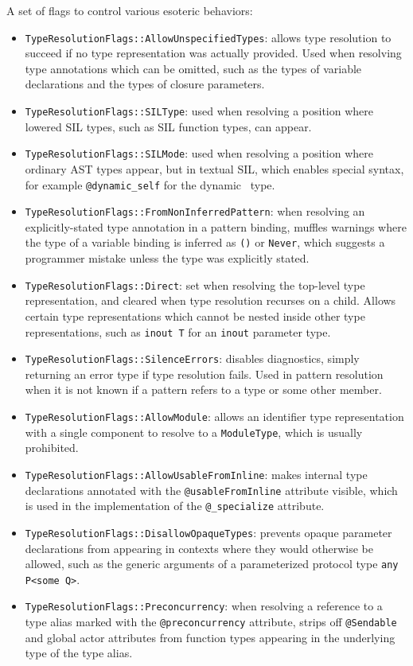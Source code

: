 \documentclass[../generics]{subfiles}
\begin{document}
A set of flags to control various esoteric behaviors:
\begin{itemize}
\item \texttt{TypeResolutionFlags::AllowUnspecifiedTypes}: allows type resolution to succeed if no type representation was actually provided. Used when resolving type annotations which can be omitted, such as the types of variable declarations and the types of closure parameters.
\item \texttt{TypeResolutionFlags::SILType}: used when resolving a position where lowered SIL types, such as SIL function types, can appear.
\item \texttt{TypeResolutionFlags::SILMode}: used when resolving a position where ordinary AST types appear, but in textual SIL, which enables special syntax, for example \verb|@dynamic_self| for the dynamic \tSelf\ type.
\item \texttt{TypeResolutionFlags::FromNonInferredPattern}: when resolving an explicitly-stated type annotation in a pattern binding, muffles warnings where the type of a variable binding is inferred as \texttt{()} or \texttt{Never}, which suggests a programmer mistake unless the type was explicitly stated.
\item \texttt{TypeResolutionFlags::Direct}: set when resolving the top-level type representation, and cleared when type resolution recurses on a child. Allows certain type representations which cannot be nested inside other type representations, such as \texttt{inout T} for an \texttt{inout} parameter type.
\item \texttt{TypeResolutionFlags::SilenceErrors}: disables diagnostics, simply returning an error type if type resolution fails. Used in pattern resolution when it is not known if a pattern refers to a type or some other member.
\item \texttt{TypeResolutionFlags::AllowModule}: allows an identifier type representation with a single component to resolve to a \texttt{ModuleType}, which is usually prohibited.
\item \texttt{TypeResolutionFlags::AllowUsableFromInline}: makes internal type declarations annotated with the \texttt{@usableFromInline} attribute visible, which is used in the implementation of the \verb|@_specialize| attribute.
\item \texttt{TypeResolutionFlags::DisallowOpaqueTypes}: prevents opaque parameter declarations from appearing in contexts where they would otherwise be allowed, such as the generic arguments of a parameterized protocol type \verb|any P<some Q>|.
\item \texttt{TypeResolutionFlags::Preconcurrency}: when resolving a reference to a type alias marked with the \texttt{@preconcurrency} attribute, strips off \texttt{@Sendable} and global actor attributes from function types appearing in the underlying type of the type alias.
\end{itemize}
\end{document}
